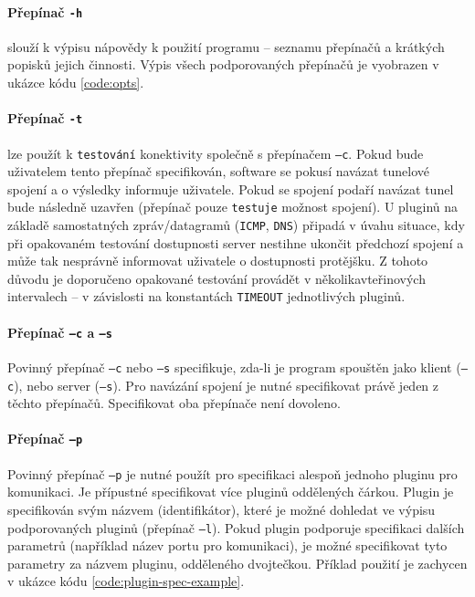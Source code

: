 \documentclass[thesis=M,czech]{FITthesis}[2012/10/20]
\begin{document}
    \paragraph{Přepínač \texttt{-h}} slouží k výpisu nápovědy k použití programu -- seznamu přepínačů a krátkých popisků jejich činnosti. Výpis všech podporovaných přepínačů je vyobrazen v ukázce kódu \ref{code:opts}.
    
    \paragraph{Přepínač \texttt{-t}} lze použít k \texttt{testování} konektivity společně s přepínačem \texttt{--c}. Pokud bude uživatelem tento přepínač specifikován, software se pokusí navázat tunelové spojení a o výsledky informuje uživatele. Pokud se spojení podaří navázat tunel bude následně uzavřen (přepínač pouze \texttt{testuje} možnost spojení). U pluginů na základě samostatných zpráv/datagramů (\texttt{ICMP}, \texttt{DNS}) připadá v úvahu situace, kdy při opakovaném testování dostupnosti server nestihne ukončit předchozí spojení a může tak nesprávně informovat uživatele o dostupnosti protějšku. Z tohoto důvodu je doporučeno opakované testování provádět v několikavteřinových intervalech -- v závislosti na konstantách \texttt{TIMEOUT} jednotlivých pluginů.
    
    \paragraph{Přepínač \texttt{--c} a \texttt{--s}} Povinný přepínač \texttt{--c} nebo \texttt{--s} specifikuje, zda-li je program spouštěn jako klient (\texttt{--c}), nebo server (\texttt{--s}). Pro navázání spojení je nutné specifikovat právě jeden z těchto přepínačů. Specifikovat oba přepínače není dovoleno.
    
    \paragraph{Přepínač \texttt{--p}} Povinný přepínač \texttt{--p} je nutné použít pro specifikaci alespoň jednoho pluginu pro komunikaci. Je přípustné specifikovat více pluginů oddělených čárkou. Plugin je specifikován svým názvem (identifikátor), které je možné dohledat ve výpisu podporovaných pluginů (přepínač \texttt{--l}). Pokud plugin podporuje specifikaci dalších parametrů (například název portu pro komunikaci), je možné specifikovat tyto parametry za názvem pluginu, odděleného dvojtečkou. Příklad použití je zachycen v ukázce kódu \ref{code:plugin-spec-example}.
    
\end{document}
